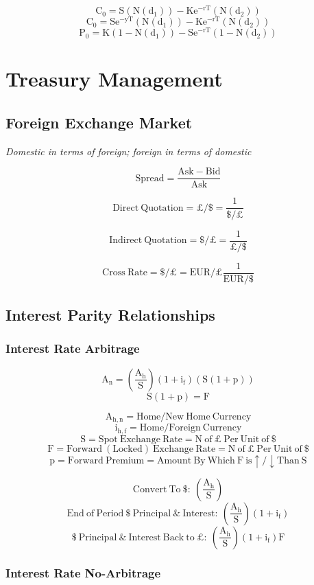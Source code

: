 \documentclass[11pt, english]{article}
\begin{document}
	$$\mathrm{C_0=S(N(d_1))-Ke^{-rT}(N(d_2))}$$
	$$\mathrm{C_0=Se^{-yT}(N(d_1))-Ke^{-rT}(N(d_2))}$$
	$$\mathrm{P_0=K(1-N(d_1))-Se^{-rT}(1-N(d_2))}$$

\newpage

\section{Treasury Management}

	\subsection{Foreign Exchange Market}

	\textit{Domestic in terms of foreign; foreign in terms of domestic}

	$$\mathrm{Spread=\frac{Ask-Bid}{Ask}}$$

	$$\mathrm{Direct\ Quotation=\pounds/\$=\frac{1}{\$/\pounds}}$$

	$$\mathrm{Indirect\ Quotation=\$/\pounds=\frac{1}{\pounds/\$}}$$

	$$\mathrm{Cross\ Rate=\$/\pounds=EUR/\pounds\frac{1}{EUR/\$}}$$

	\subsection{Interest Parity Relationships}

		\subsubsection{Interest Rate Arbitrage}

	$$\mathrm{A_n=\left(\frac{A_h}{S}\right)(1+i_f)(S(1+p))}$$
	$$\mathrm{S(1+p)=F}$$

	$$\mathrm{A_{h,n}=Home/New\ Home\ Currency}$$
	$$\mathrm{i_{h,f}=Home/Foreign\ Currency}$$
	$$\mathrm{S=Spot\ Exchange\ Rate=N\ of\ \pounds\ Per\ Unit\ of\ \$}$$
	$$\mathrm{F=Forward\ (Locked)\ Exchange\ Rate=N\ of\ \pounds\ Per\ Unit\ of\ \$}$$
	$$\mathrm{p=Forward\ Premium=Amount\ By\ Which\ F\ is \uparrow/\downarrow Than\ S}$$

	$$\mathrm{Convert\ To\ \$:\ \left(\frac{A_h}{S}\right)}$$
	$$\mathrm{End\ of\ Period\ \$\ Principal\ \&\ Interest:\ \left(\frac{A_h}{S}\right)(1+i_f)}$$
	$$\mathrm{\$\ Principal\ \&\ Interest\ Back\ to\ \pounds:\ \left(\frac{A_h}{S}\right)(1+i_f)F}$$

		\subsubsection{Interest Rate No-Arbitrage}
\end{document}
